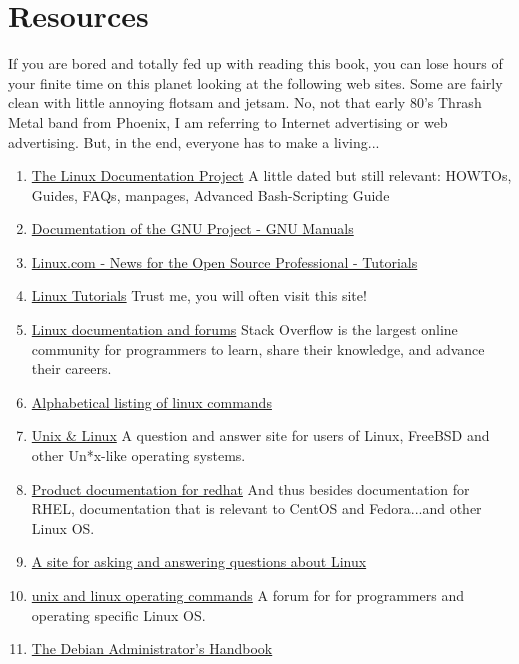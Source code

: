 \section{Resources}

If you are bored and totally fed up with reading this book, you can lose hours of your finite time on this planet looking at the following web sites. Some are fairly clean with little annoying flotsam and jetsam. No, not that early 80's Thrash Metal band from Phoenix, I am referring to Internet advertising or web advertising. But, in the end, everyone has to make a living...

\begin{enumerate}
	\item{\href{http://tldp.org}{The Linux Documentation Project}} 
		A little dated but still relevant: HOWTOs, Guides, FAQs, manpages, Advanced Bash-Scripting Guide
	\item{\href{https://www.gnu.org/doc/doc.en.html}{Documentation of the GNU Project - GNU Manuals}}
	\item{\href{https://www.linux.com/tutorials}{Linux.com - News for the Open Source Professional - Tutorials}}
	\item{\href{https://www.howtoforge.com/}{Linux Tutorials}} 
		Trust me, you will often visit this site!
	\item{\href{http://stackoverflow.com}{Linux documentation and forums}} 
		Stack Overflow is the largest online community for programmers to learn, share their knowledge, and advance their careers.
	\item{\href{http://fedoralinuxcommands.blogspot.ca/}{Alphabetical listing of linux commands}} 
	\item{\href{http://unix.stackexchange.com/}{Unix \& Linux}} 
		A question and answer site for users of Linux, FreeBSD and other Un*x-like operating systems.
	\item{\href{https://access.redhat.com/documentation/en/}{Product documentation for redhat}} 
		And thus besides documentation for RHEL, documentation that is relevant to CentOS and Fedora...and other Linux OS.
	\item{\href{http://www.linuxquestions.org}{A site for asking and answering questions about Linux}}
	\item{\href{http://www.unix.com}{unix and linux operating commands}} 
		A forum for for programmers and operating specific Linux OS.
	\item{\href{https://debian-handbook.info/}{The Debian Administrator's Handbook}} 
\end{enumerate}

